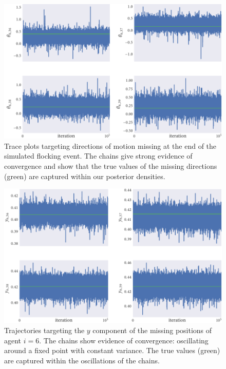 \begin{figure}[tbp]
  \includegraphics{end/dir_trace.pdf}
  \caption{Trace plots targeting directions of motion missing at the end of the
  simulated flocking event. The chains give strong evidence of convergence and
  show that the true values of the missing directions (green) are captured within
  our posterior densities.}
  \label{fig:end_dir_trace}
\end{figure}
\begin{figure}[tbp]
  \includegraphics{end/y_trace.pdf}
  \caption{Trajectories targeting the $y$ component of the missing positions of
    agent $i=6$. The chains show evidence of convergence: oscillating around
    a fixed point with constant variance. The true values (green) are
    captured within the oscillations of the chains.}
  \label{fig:end_y_trace}
\end{figure}
